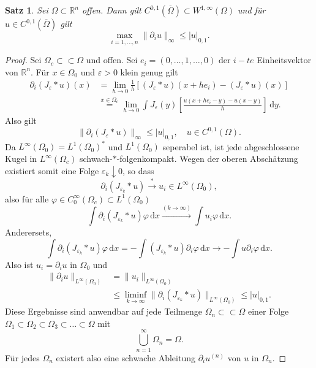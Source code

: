 \documentclass[
paper=a4,
bibtotocnumbered,
liststotocnumbered,
tablecaptionabove,
pointlessnumbers,
twoside,
openright,
10pt
]
{report}
\let\phi\varphi
\newtheorem{satz}[thm]{Satz}
\theoremstyle{definition}
\numberwithin{equation}{chapter}
\begin{document}
\begin{satz}
 Sei $\Omega\subset \mathbb R^n$ offen. Dann gilt $C^{0,1}(\overline{\Omega})\subset W^{1,\infty}(\Omega)$ und für $u\in C^{0,1}(\overline{\Omega})$ gilt
 \begin{equation}
  \max_{i=1,\ldots, n} \| \partial_i u\|_\infty\le |u|_{0,1}.
 \end{equation}
\end{satz}

\begin{proof}
 Sei $\Omega_c \subset \subset \Omega$ und offen. Sei $e_i = (0,\ldots, 1, \ldots, 0)$ der $i-te$ Einheitsvektor von $\mathbb R^n$.
Für $x\in \Omega_0$ und $\varepsilon >0$ klein genug gilt
 \begin{align*}
  \partial_i(J_\varepsilon * u) (x)&= \lim_{h\to 0} \frac{1}{h} \left [ (J_\varepsilon * u) (x+he_i) - (J_\varepsilon*u) (x)\right ] \\
  &\stackrel{x\in \Omega_c}=\lim_{h\to 0} \int J_{\varepsilon}(y) \left [ \frac{u(x+he_i -y) - u(x-y)}{h} \right ]\, \mathrm dy.
 \end{align*}
 Also gilt
 \begin{equation}\label{eq:4.4}
  \|\partial_i (J_\varepsilon * u) \|_\infty \le |u|_{0,1}, \quad u\in C^{0,1}(\Omega).
 \end{equation}
 Da $L^\infty(\Omega_0) = L^1(\Omega_0)^*$ und $L^1(\Omega_0)$ seperabel ist, ist jede abgeschlossene Kugel in $L^\infty(\Omega_c)$ schwach-$*$-folgenkompakt. Wegen der oberen Abschätzung existiert somit eine Folge $\varepsilon_k \downarrow 0$, so dass 
 \begin{equation}
  \partial_i (J_{\varepsilon_k} * u) \stackrel{*}{\to} u_i \in L^\infty(\Omega_0),
 \end{equation}
also für alle $\phi \in C_0^\infty(\Omega_c) \subset L^1(\Omega_0)$
 \begin{equation}
  \int \partial_i (J_{\varepsilon_k} *u) \phi \, \mathrm dx \stackrel{(k\to \infty)}{\to} \int u_i \phi \, \mathrm dx.
 \end{equation}
 Anderersets,
 \begin{equation}
  \int \partial_i (J_{\varepsilon_k} * u) \phi \, \mathrm dx = - \int (J_{\varepsilon_k} * u) \partial_i \phi \, \mathrm dx \to - \int u\partial_i \phi \, \mathrm dx.
 \end{equation}
Also ist $u_i = \partial_i u$ in $\Omega_0$ und 
\begin{equation}\label{eq:4.5}
\begin{split}
\| \partial_i u\|_{L^\infty(\Omega_0)} &= \| u_i \|_{L^\infty(\Omega_0)} \\
&\le \liminf_{k\to \infty} \| \partial_i (J_{\varepsilon_k} * u) \|_{L^\infty(\Omega_0)} \le |u|_{0,1}. 
\end{split}
\end{equation}
Diese Ergebnisse sind anwendbar auf jede Teilmenge $\Omega_n\subset \subset \Omega$ einer Folge $\Omega_1 \subset \Omega_2 \subset \Omega_3 \subset \ldots \subset \Omega$ mit
\begin{equation}
 \bigcup_{n=1}^\infty \Omega_n = \Omega.
\end{equation}
Für jedes $\Omega_n$ existert also eine schwache Ableitung $\partial_i u^{(n)}$ von $u$ in $\Omega_n$.


\end{proof}
\end{document}
